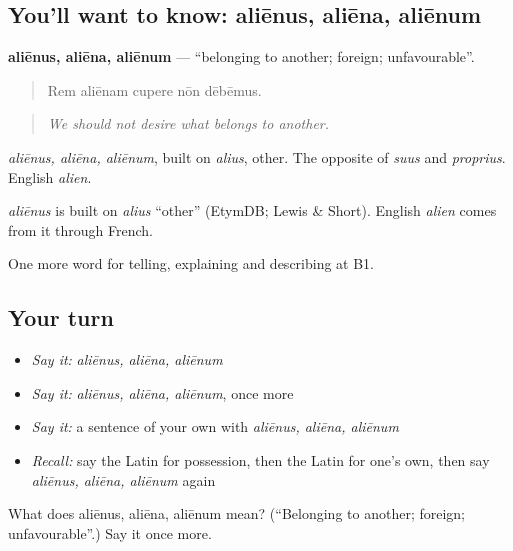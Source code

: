 \subsection*{You'll want to know: aliēnus, aliēna, aliēnum}
\textbf{aliēnus, aliēna, aliēnum} — \textquotedblleft{}belonging to another; foreign; unfavourable\textquotedblright{}.

\begin{quote}
Rem aliēnam cupere nōn dēbēmus.
\end{quote}

\begin{quote}
\emph{We should not desire what belongs to another.}
\end{quote}

\emph{aliēnus, aliēna, aliēnum}, built on \emph{alius}, other. The opposite of \emph{suus} and \emph{proprius}. English \emph{alien}.

\begin{cousinweb}
\emph{aliēnus} is built on \emph{alius} \textquotedblleft{}other\textquotedblright{} (EtymDB; Lewis \& Short). English \emph{alien} comes from it through French.
\end{cousinweb}

\begin{grammarlens}[title={What you've built}]
One more word for telling, explaining and describing at B1.
\end{grammarlens}

\subsection*{Your turn}
\begin{itemize}
\raggedright
  \item \emph{Say it:} \emph{aliēnus, aliēna, aliēnum}
  \item \emph{Say it:} \emph{aliēnus, aliēna, aliēnum}, once more
  \item \emph{Say it:} a sentence of your own with \emph{aliēnus, aliēna, aliēnum}
  \item \emph{Recall:} say the Latin for possession, then the Latin for one's own, then say \emph{aliēnus, aliēna, aliēnum} again
\end{itemize}

\begin{tcolorbox}[breakable,colback=teal!4,colframe=teal!35!black,title={Before you move on}]
What does aliēnus, aliēna, aliēnum mean? (\textquotedblleft{}Belonging to another; foreign; unfavourable\textquotedblright{}.) Say it once more.
\end{tcolorbox}
